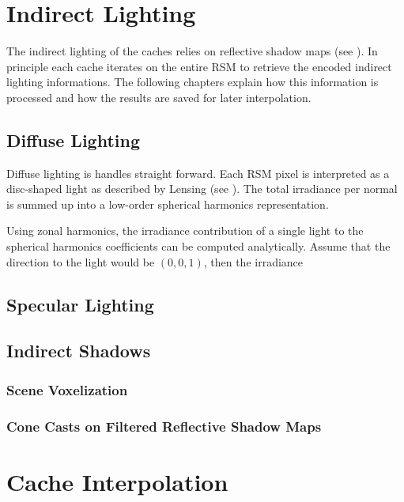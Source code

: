 \documentclass[thesis.tex]{subfiles}
\begin{document}
\section{Indirect Lighting}
The indirect lighting of the caches relies on reflective shadow maps (see ).
In principle each cache iterates on the entire RSM to retrieve the encoded indirect lighting informations.
The following chapters explain how this information is processed and how the results are saved for later interpolation.

\subsection{Diffuse Lighting}
Diffuse lighting is handles straight forward.
Each RSM pixel is interpreted as a disc-shaped light as described by Lensing (see ).
The total irradiance per normal is summed up into a low-order spherical harmonics representation.

Using zonal harmonics, the irradiance contribution of a single light to the spherical harmonics coefficients can be computed analytically.
Assume that the direction to the light would be $(0,0,1)$, then the irradiance 
\begin{equation}

\end{equation}


\subsection{Specular Lighting}


\subsection{Indirect Shadows}

\subsubsection{Scene Voxelization}

\subsubsection{Cone Casts on Filtered Reflective Shadow Maps}


\section{Cache Interpolation}
\end{document}
